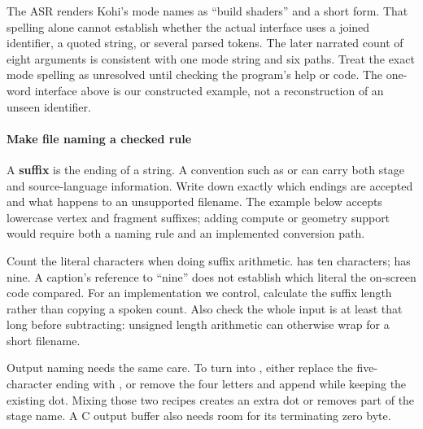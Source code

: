The ASR renders Kohi's mode names as ``build shaders'' and a short form. That spelling alone cannot establish whether the actual interface uses a joined identifier, a quoted string, or several parsed tokens. The later narrated count of eight arguments is consistent with one mode string and six paths. Treat the exact mode spelling as unresolved until checking the program's help or code. The one-word  interface above is our constructed example, not a reconstruction of an unseen identifier.

\paragraph{Make file naming a checked rule}\label{05-engine-i-ch013-make-file-naming-a-checked-rule}

\hypertarget{05-engine-i-ch013-make-file-naming-a-checked-rule}{}

A \textbf{suffix} is the ending of a string. A convention such as  or  can carry both stage and source-language information. Write down exactly which endings are accepted and what happens to an unsupported filename. The example below accepts lowercase vertex and fragment suffixes; adding compute or geometry support would require both a naming rule and an implemented conversion path.

Count the literal characters when doing suffix arithmetic.  has ten characters;  has nine. A caption's reference to ``nine'' does not establish which literal the on-screen code compared. For an implementation we control, calculate the suffix length rather than copying a spoken count. Also check the whole input is at least that long before subtracting: unsigned length arithmetic can otherwise wrap for a short filename.

Output naming needs the same care. To turn  into , either replace the five-character  ending with , or remove the four letters  and append  while keeping the existing dot. Mixing those two recipes creates an extra dot or removes part of the stage name. A C output buffer also needs room for its terminating zero byte.

